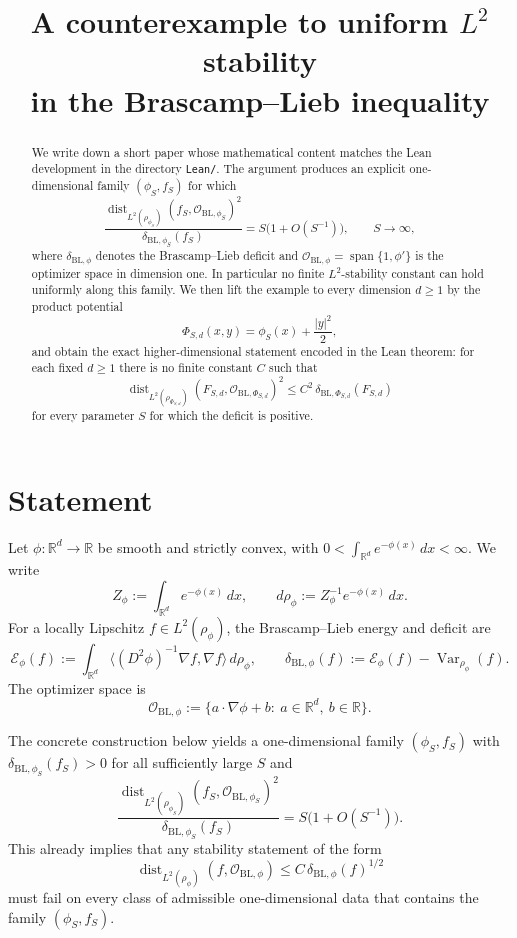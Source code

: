 \documentclass[11pt]{amsart}
\title[A counterexample to uniform $L^2$ stability]{A counterexample to uniform $L^2$ stability\\ in the Brascamp--Lieb inequality}
\author{}
\date{}
\theoremstyle{remark}
\DeclareMathOperator{\Var}{Var}
\DeclareMathOperator{\dist}{dist}
\DeclareMathOperator{\spanop}{span}
\newcommand{\R}{\mathbb R}
\newcommand{\cO}{\mathcal O}
\newcommand{\BL}{\mathrm{BL}}
\begin{document}
\begin{abstract}
We write down a short paper whose mathematical content matches the Lean
development in the directory \texttt{Lean/}. The argument produces an explicit
one-dimensional family $(\phi_S,f_S)$ for which
\[
  \frac{\dist_{L^2(\rho_{\phi_S})}(f_S,\cO_{\BL,\phi_S})^2}
       {\delta_{\BL,\phi_S}(f_S)}
  = S\bigl(1+O(S^{-1})\bigr),
  \qquad S\to\infty,
\]
where $\delta_{\BL,\phi}$ denotes the Brascamp--Lieb deficit and
$\cO_{\BL,\phi}=\spanop\{1,\phi'\}$ is the optimizer space in dimension one.
In particular no finite $L^2$-stability constant can hold uniformly along this
family. We then lift the example to every dimension $d\ge 1$ by the product
potential
\[
  \Phi_{S,d}(x,y)=\phi_S(x)+\frac{|y|^2}{2},
\]
and obtain the exact higher-dimensional statement encoded in the Lean theorem:
for each fixed $d\ge 1$ there is no finite constant $C$ such that
\[
  \dist_{L^2(\rho_{\Phi_{S,d}})}(F_{S,d},\cO_{\BL,\Phi_{S,d}})^2
  \le C^2\,\delta_{\BL,\Phi_{S,d}}(F_{S,d})
\]
for every parameter $S$ for which the deficit is positive.
\end{abstract}

\maketitle

\section{Statement}

Let $\phi:\R^d\to\R$ be smooth and strictly convex, with
$0<\int_{\R^d}e^{-\phi(x)}\,dx<\infty$. We write
\[
  Z_\phi:=\int_{\R^d}e^{-\phi(x)}\,dx,
  \qquad
  d\rho_\phi:=Z_\phi^{-1}e^{-\phi(x)}\,dx.
\]
For a locally Lipschitz $f\in L^2(\rho_\phi)$, the Brascamp--Lieb energy and
deficit are
\[
  \mathcal E_\phi(f)
  :=\int_{\R^d}\langle (D^2\phi)^{-1}\nabla f,\nabla f\rangle\,d\rho_\phi,
  \qquad
  \delta_{\BL,\phi}(f):=\mathcal E_\phi(f)-\Var_{\rho_\phi}(f).
\]
The optimizer space is
\[
  \cO_{\BL,\phi}
  :=
  \{a\cdot\nabla\phi+b:\ a\in\R^d,\ b\in\R\}.
\]

The concrete construction below yields a one-dimensional family
$(\phi_S,f_S)$ with $\delta_{\BL,\phi_S}(f_S)>0$ for all sufficiently large
$S$ and
\[
  \frac{\dist_{L^2(\rho_{\phi_S})}(f_S,\cO_{\BL,\phi_S})^2}
       {\delta_{\BL,\phi_S}(f_S)}
  =S\bigl(1+O(S^{-1})\bigr).
\]
This already implies that any stability statement of the form
\[
  \dist_{L^2(\rho_\phi)}(f,\cO_{\BL,\phi})
  \le C\,\delta_{\BL,\phi}(f)^{1/2}
\]
must fail on every class of admissible one-dimensional data that contains the
family $(\phi_S,f_S)$.
\end{document}
